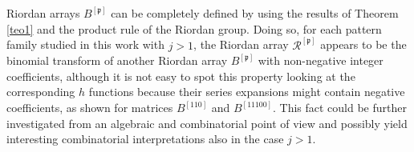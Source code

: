 Riordan arrays $B^{[\mathfrak{p}]}$ can be completely defined by using the
results of Theorem \ref{teo1} and the product rule of the Riordan group.  Doing
so, for each pattern family studied in this work with $j>1$, the Riordan array
$\mathcal{R}^{[\mathfrak{p}]}$  appears to be the binomial transform of another
Riordan array $B^{[\mathfrak{p}]}$ with non-negative integer coefficients,
although it is not easy to spot this property looking at the corresponding $h$
functions because their series expansions might contain negative coefficients,
as shown for matrices $B^{[110]}$ and $B^{[11100]}$.  This fact could  be
further investigated from an algebraic and combinatorial point of view and
possibly yield interesting combinatorial interpretations also in the case
$j>1.$


